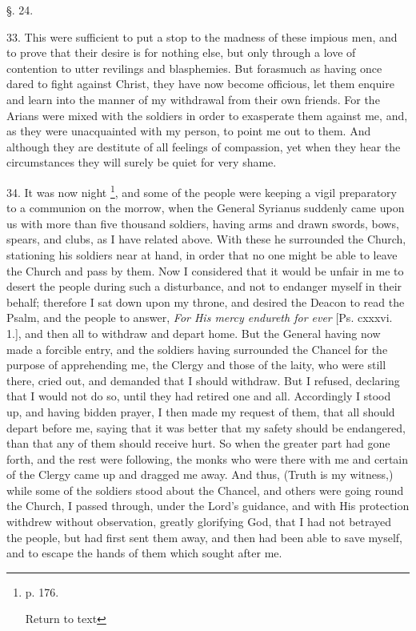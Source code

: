 §. 24.

33. This were sufficient to put a stop to the
madness of these impious men, and to prove that their desire is for
nothing else, but only through a love of contention to utter revilings
and blasphemies. But forasmuch as having once dared to fight
against Christ, they have now become officious, let them enquire and
learn into the manner of my withdrawal from their own friends. For the
Arians were mixed with the soldiers in order to exasperate them
against me, and, as they were unacquainted with my person, to point me
out to them. And although they are destitute of all feelings of
compassion, yet when they hear the circumstances they will surely be
quiet for very shame.

34. It was now night \footnote{p. 176.

Return to text}, and some of the people were keeping a vigil preparatory to a
communion on the morrow, when the General Syrianus suddenly came upon
us with more than five thousand soldiers, having arms and drawn
swords, bows, spears, and clubs, as I have related above. With these
he surrounded the Church, stationing his soldiers near at hand, in
order that no one might be able to leave the Church and pass by them.
Now I considered that it would be unfair in me to desert the people
during such a disturbance, and not to endanger myself in their behalf;
therefore I sat down upon my throne, and desired the Deacon to read
the Psalm, and the people to answer, \emph{For His mercy endureth for
ever} [Ps. cxxxvi. 1.], and then all to withdraw and depart home.
But the General having now made a forcible entry, and the soldiers
having surrounded the Chancel for the purpose of apprehending me, the
Clergy and those of the laity, who were still there, cried out, and
demanded that I should withdraw. But I refused, declaring that I would
not do so, until they had retired one and all. Accordingly I stood up,
and having bidden prayer, I then made my request of them, that all
should depart before me, saying that it was better that my safety
should be endangered, than that any of them should receive hurt. So
when the greater part had gone forth, and the rest were following, the
monks who were there with me and certain of the Clergy came up and
dragged me away. And thus, (Truth is my witness,) while some of the
soldiers stood about the Chancel, and others were going round the
Church, I passed through, under the Lord's guidance, and with His
protection withdrew without observation, greatly glorifying God, that
I had not betrayed the people, but had first sent them away, and
then had been able to save myself, and to escape the hands of them
which sought after me.

